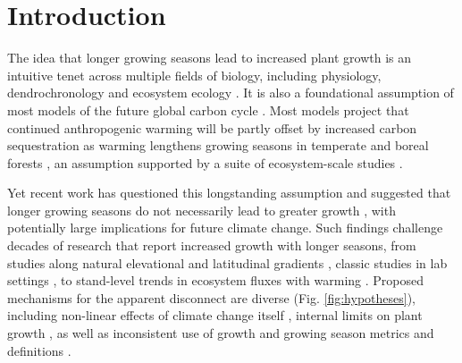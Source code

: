 \documentclass[11pt]{article}
\begin{document}
\section*{Introduction} %

The idea that longer growing seasons lead to increased plant growth is an intuitive tenet across multiple fields of biology, including physiology, dendrochronology and ecosystem ecology \citep{nobel1983biophysical,frank2022dendrochronology}. It is also a foundational assumption of most models of the future global carbon cycle \citep[e.g.][]{friedlingstein2022global, ito2020global}. Most models project that continued anthropogenic warming will be partly offset by increased carbon sequestration as warming lengthens growing seasons in temperate and boreal forests \citep{friedlingstein2022global}, an assumption supported by a suite of ecosystem-scale studies \citep{chen1999effects,keenan2014net,finzi2020}. 

Yet recent work has questioned this longstanding assumption and suggested that longer growing seasons do not necessarily lead to greater growth \citep[e.g.][]{dow2022warm,green2022limits,silvestro2023longer}, with potentially large implications for future climate change. %
Such findings challenge decades of research that report increased growth with longer seasons, from studies along natural elevational and latitudinal gradients \citep[][]{myneni1997increased,berdanier2011growing,king2013tree,cuapio2022there}, classic studies in lab settings \citep{went1957experimental}, to stand-level trends in ecosystem fluxes with warming \citep{chen1999effects,keenan2014net,finzi2020}. Proposed mechanisms for the apparent disconnect are diverse (Fig. \ref{fig:hypotheses}), including non-linear effects of climate change itself \citep[e.g., drought or heat stress,][]{dow2022warm}, internal limits on plant growth  \citep{zohner2023effect}, as well as inconsistent use of growth and growing season metrics and definitions \citep{green2022limits,korner2023four}.
\end{document}
